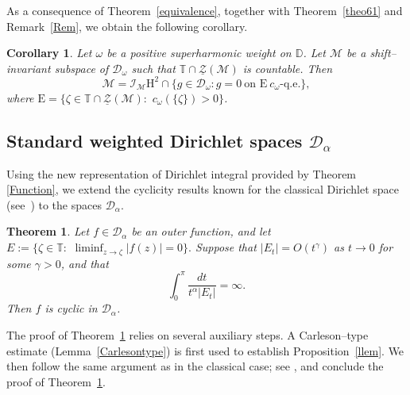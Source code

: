 \documentclass[12pt,reqno,a4paper]{amsart}
\newtheorem{theo}[prop]{Theorem}
\newtheorem{coro}{Corollary}
\newcommand{\cM}{{\mathcal{M}}}
\newcommand{\hH}{\mathrm{H^2 }}
\newcommand{\Ee}{\mathrm{E}}
\newcommand\TT{\mathbb{T}}
\newcommand\DD{\mathbb{D}}
\newcommand{\cZ}{{\mathcal{Z}}}
\newcommand{\cD}{{\mathcal{D}}}
\numberwithin{equation}{section}
\begin{document}
	
	As a consequence of Theorem~\ref{equivalence}, together with Theorem~\ref{theo61} and Remark~\ref{Rem}, we obtain the following corollary.
	
	
	\begin{coro}
		Let $\omega$ be a positive superharmonic weight on $\DD$. Let $\cM$ be a shift--invariant subspace of $\cD_\omega$ such that $\TT \cap \underline{\cZ}(\cM)$ is countable. Then 
		$$
		\cM = \mathcal{I}_{\cM}\hH \cap \{ g \in \mathcal{D}_\omega : g = 0 \ \text{on } \Ee \ \text{$c_\omega$-q.e.} \},
		$$
		where $\Ee = \{\zeta \in \TT \cap \underline{\cZ}(\cM) : \,\, c_\omega(\{\zeta\}) > 0\}$.
	\end{coro}
	
	
	\subsection{Standard weighted Dirichlet spaces $\cD_\alpha$}
	Using the new representation of Dirichlet integral provided by Theorem \ref{Function}, we extend the cyclicity results known for the classical Dirichlet space (see~\cite{EKR, EKR1}) to the spaces $\cD_\alpha$.
	\begin{theo}\label{Dalpha}
		Let $f\in\cD_\alpha$ be an outer function, and let $E:=\{\zeta\in \TT:\,\,\liminf_{z\to \zeta}|f(z)|=0\}.$ Suppose that $|E_t|=O(t^{\gamma})$ as $t\to 0$ for some $\gamma>0$, and that 
		\[
		\int_0^{\pi}\frac{dt}{t^{\alpha}|E_t|}=\infty.
		\]
		Then $f$ is cyclic in $\cD_\alpha$.
	\end{theo}
	The proof of Theorem~\ref{Dalpha} relies on several auxiliary steps. A Carleson--type estimate (Lemma~\ref{Carlesontype}) is first used to establish Proposition~\ref{llem}. We then follow the same argument as in the classical case; see \cite{EKR}, and conclude the proof of Theorem~\ref{Dalpha}.
	
\end{document}
